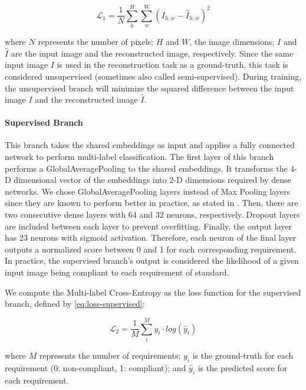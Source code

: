 \begin{equation}
\label{eq:loss-unsupervised}
\mathcal{L}_1 = \frac{1}{N} \sum_h^H \sum_w^W ({I_{h,w} - \hat{I}_{h,w}})^2
\end{equation}

\noindent where $N$ represents the number of pixels; $H$ and $W$, the image dimensions; $I$ and $\hat{I}$ are the input image and the reconstructed image, respectively. Since the same input image $I$ is used in the reconstruction task as a ground-truth, this task is considered unsupervised (sometimes also called semi-supervised). During training, the unsupervised branch will minimize the squared difference between the input image $I$ and the reconstructed image $\hat{I}$.

\paragraph{Supervised Branch}

This branch takes the shared embeddings as input and applies a fully connected network to perform multi-label classification. The first layer of this branch performs a GlobalAveragePooling to the shared embeddings. It transforms the 4-D dimensional vector of the embeddings into 2-D dimensions required by dense networks. We chose GlobalAveragePooling layers instead of Max Pooling layers since they are known to perform better in practice, as stated in \cite{zhou2016learning}. Then, there are two consecutive dense layers with 64 and 32 neurons, respectively. Dropout layers are included between each layer to prevent overfitting. Finally, the output layer has 23 neurons with sigmoid activation. Therefore, each neuron of the final layer outputs a normalized score between 0 and 1 for each corresponding requirement. In practice, the supervised branch's output is considered the likelihood of a given input image being compliant to each requirement of \icao standard.

We compute the Multi-label Cross-Entropy as the loss function for the supervised branch, defined by \autoref{eq:loss-supervised}:

\begin{equation}
\label{eq:loss-supervised}
\mathcal{L}_2 = \frac{1}{M} \sum_i^M {y_i \cdot log(\hat{y}_i)}
\end{equation}

\noindent where $M$ represents the number of requirements; $y_i$ is the ground-truth for each requirement (0: non-compliant, 1: compliant); and $\hat{y}_i$ is the predicted score for each requirement.

